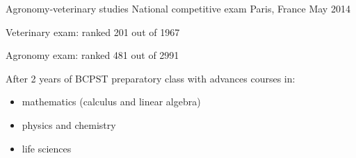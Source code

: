 \begin{cventries}
    \cventry
    {Agronomy-veterinary studies } %
    {National competitive exam} %
    {Paris, France} %
    {May 2014} %
    {
      \begin{cvitems} %
        \item {Veterinary exam: ranked 201 out of 1967}
        \item {Agronomy exam: ranked 481 out of 2991}
        \item {After 2 years of BCPST preparatory class with advances courses in: \begin{itemize}
          \item mathematics (calculus and linear algebra)
          \item physics and chemistry
          \item life sciences
        \end{itemize}}
      \end{cvitems}
    }
\end{cventries}
